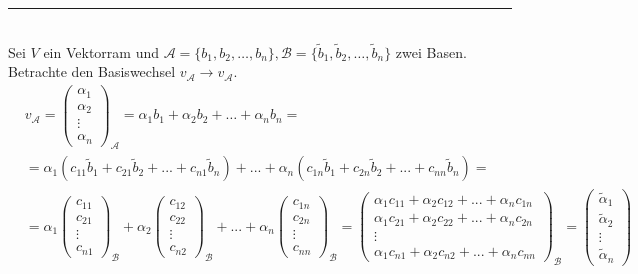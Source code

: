 \documentclass{article}
\begin{document}
\vspace{0.5cm}

{\color{blue}
\hrule
	\\
	Sei $V$ ein Vektorram und $\mathcal{A} = \{b_1, b_2,\dots, b_n\}, \mathcal{B} = \{\tilde{b}_1, \tilde{b}_2, \dots, \tilde{b}_n\}$ zwei Basen.\\
	Betrachte den Basiswechsel $v_{\mathcal{A}}\to v_{\mathcal{A}}$.
		\begin{align*}
			& v_{\mathcal{A}} =
			\begin{pmatrix}
				\alpha_1\\ \alpha_2\\ \vdots\\ \alpha_n
			\end{pmatrix}_{\mathcal{A}}
			= \alpha_1 b_1 + \alpha_2 b_2 + \dots + \alpha_n b_n = \\
			&= \alpha_1 (c_{11}\tilde{b}_1 + c_{21}\tilde{b}_2 + ... + c_{n1}\tilde{b}_n) + ... + \alpha_n (c_{1n}\tilde{b}_1 + c_{2n}\tilde{b}_2 + ... + c_{nn}\tilde{b}_n) = \\
			&= \alpha_1
			\begin{pmatrix}
				c_{11}\\ c_{21}\\ \vdots\\ c_{n1}
			\end{pmatrix}_{\mathcal{B}}
			+
			\alpha_2
			\begin{pmatrix}
				c_{12}\\ c_{22}\\ \vdots\\ c_{n2}
			\end{pmatrix}_{\mathcal{B}}
			+ ... +
			\alpha_n
			\begin{pmatrix}
				c_{1n}\\ c_{2n}\\ \vdots\\ c_{nn}
			\end{pmatrix}_{\mathcal{B}}
			=
			\begin{pmatrix}
				\alpha_1 c_{11} + \alpha_2 c_{12} + ... + \alpha_n c_{1n}\\
				\alpha_1 c_{21} + \alpha_2 c_{22} + ... + \alpha_n c_{2n}\\
				\vdots\\
				\alpha_1 c_{n1} + \alpha_2 c_{n2} + ... + \alpha_n c_{nn}
			\end{pmatrix}_{\mathcal{B}}
			=
			\begin{pmatrix}
				\tilde{\alpha}_1\\ \tilde{\alpha}_2 \\ \vdots \\ \tilde{\alpha}_n

\end{pmatrix}
\end{align*}}
\end{document}
